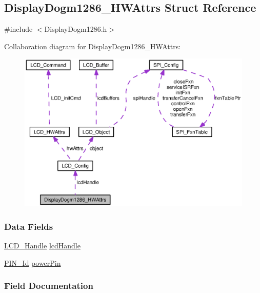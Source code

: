 \subsection{Display\+Dogm1286\+\_\+\+H\+W\+Attrs Struct Reference}
\label{struct_display_dogm1286___h_w_attrs}


{\ttfamily \#include $<$Display\+Dogm1286.\+h$>$}



Collaboration diagram for Display\+Dogm1286\+\_\+\+H\+W\+Attrs\+:
\nopagebreak
\begin{figure}[H]
\begin{center}
\leavevmode
\includegraphics[width=350pt]{struct_display_dogm1286___h_w_attrs__coll__graph}
\end{center}
\end{figure}
\subsubsection*{Data Fields}
\begin{DoxyCompactItemize}
\item 
\hyperlink{_l_c_d_dogm1286_8h_a72910a78c343543f1610fd082d17d803}{L\+C\+D\+\_\+\+Handle} \hyperlink{struct_display_dogm1286___h_w_attrs_a5b7a6005271e6c9117a617e9c735ece1}{lcd\+Handle}
\item 
\hyperlink{_p_i_n_8h_a9ae8197f460bb76ea09a84f47d09921f}{P\+I\+N\+\_\+\+Id} \hyperlink{struct_display_dogm1286___h_w_attrs_a9949d110bdfbcab837d945a2e27dadd2}{power\+Pin}
\end{DoxyCompactItemize}


\subsubsection{Field Documentation}
